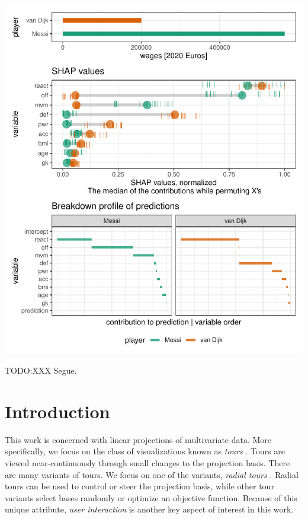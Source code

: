 \documentclass{template/monashthesis}
\begin{document}
\begin{center}\includegraphics[width=1\linewidth,]{./figures_from_script/ch5_fig1_shap_distr_bd} \end{center}

TODO:XXX Segue.

\hypertarget{sec:intro}{%
\section{Introduction}\label{sec:intro}}

This work is concerned with linear projections of multivariate data. More specifically, we focus on the class of visualizations known as \emph{tours} \autocite{cook_grand_2008,lee_review_2021}. Tours are viewed near-continuously through small changes to the projection basis. There are many variants of tours. We focus on one of the variants, \emph{radial tours} \autocite{cook_manual_1997,spyrison_spinifex_2020}. Radial tours can be used to control or steer the projection basis, while other tour variants select bases randomly or optimize an objective function. Because of this unique attribute, \emph{user interaction} is another key aspect of interest in this work.
\end{document}
